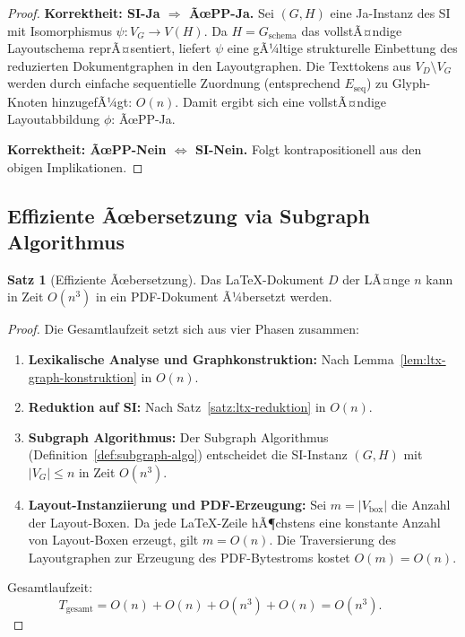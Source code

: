 ﻿\documentclass[a4paper,12pt]{article}
\theoremstyle{definition}
\newtheorem{satz}{Satz}
\begin{document}
\begin{proof}
	\medskip
	\textbf{Korrektheit: SI-Ja $\Rightarrow$ ÃœPP-Ja.}
	Sei $(G, H)$ eine Ja-Instanz des SI mit Isomorphismus $\psi: V_G \to V(H)$.
	Da $H = G_{\mathrm{schema}}$ das vollstÃ¤ndige Layoutschema reprÃ¤sentiert,
	liefert $\psi$ eine gÃ¼ltige strukturelle Einbettung des reduzierten
	Dokumentgraphen in den Layoutgraphen. Die Texttokens aus
	$V_D \setminus V_G$ werden durch einfache sequentielle Zuordnung
	(entsprechend $E_{\mathrm{seq}}$) zu Glyph-Knoten hinzugefÃ¼gt:
	$O(n)$. Damit ergibt sich eine vollstÃ¤ndige Layoutabbildung $\phi$:
	ÃœPP-Ja. 
	
	\medskip
	\textbf{Korrektheit: ÃœPP-Nein $\Leftrightarrow$ SI-Nein.}
	Folgt kontrapositionell aus den obigen Implikationen.
\end{proof}

\subsection{Effiziente Ãœbersetzung via Subgraph Algorithmus}
\label{sec:ltx-effizienz}

\begin{satz}[Effiziente Ãœbersetzung]
	\label{satz:ltx-effizienz}
	Das \LaTeX-Dokument $D$ der LÃ¤nge $n$ kann in Zeit $O(n^3)$ in ein
	PDF-Dokument Ã¼bersetzt werden.
\end{satz}

\begin{proof}
	Die Gesamtlaufzeit setzt sich aus vier Phasen zusammen:
	
	\begin{enumerate}
		\item \textbf{Lexikalische Analyse und Graphkonstruktion:}
		Nach Lemma~\ref{lem:ltx-graph-konstruktion} in $O(n)$.
		\item \textbf{Reduktion auf SI:}
		Nach Satz~\ref{satz:ltx-reduktion} in $O(n)$.
		\item \textbf{Subgraph Algorithmus:}
		Der Subgraph Algorithmus (Definition~\ref{def:subgraph-algo})
		entscheidet die SI-Instanz $(G, H)$ mit $|V_G| \le n$ in
		Zeit $O(n^3)$.
		\item \textbf{Layout-Instanziierung und PDF-Erzeugung:}
		Sei $m = |V_{\mathrm{box}}|$ die Anzahl der Layout-Boxen.
		Da jede \LaTeX-Zeile hÃ¶chstens eine konstante Anzahl von
		Layout-Boxen erzeugt, gilt $m = O(n)$.
		Die Traversierung des Layoutgraphen zur Erzeugung des PDF-Byte\-stroms
		kostet $O(m) = O(n)$.
	\end{enumerate}
	
	Gesamtlaufzeit:
	\[
	T_{\mathrm{gesamt}} = O(n) + O(n) + O(n^3) + O(n) = O(n^3). \qquad 
	\]
\end{proof}
\end{document}
